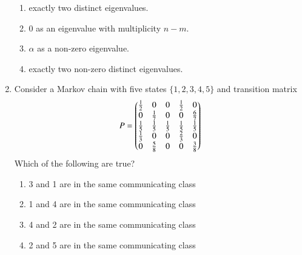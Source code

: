 \begin{enumerate}[label=\thesection.\arabic*.,ref=\thesection.\theenumi]
\begin{enumerate}
\item  exactly two distinct eigenvalues.

\item  0 as an eigenvalue with multiplicity $n-m$.

\item  $\alpha$ as a non-zero eigenvalue.

\item  exactly two non-zero distinct eigenvalues.
\end{enumerate}
%
\solution

\item %
Consider a Markov chain with five states $\{1,2,3,4,5\}$ and transition matrix
\begin{align}
    P=\begin{pmatrix}\frac{1}{2} & 0 & 0 & \frac{1}{2} & 0\\
            0 & \frac{1}{7} & 0 & 0&\frac{6}{7}\\
              \frac{1}{5} & \frac{1}{5} & \frac{1}{5} & \frac{1}{5} & \frac{1}{5}\\ \frac{1}{3} & 0 & 0 & \frac{2}{3} & 0 \\
              0 & \frac{5}{8} & 0 & 0 & \frac{3}{8}\end{pmatrix}
\end{align}
Which of the following are true?
\begin{enumerate}
\item 3 and 1 are in the same communicating class
\item 1 and 4 are in the same communicating class
\item 4 and 2 are in the same communicating class
\item 2 and 5 are in the same communicating class
\end{enumerate}
%
\solution




\end{enumerate}
